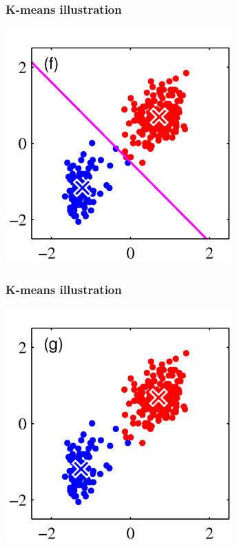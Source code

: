 \documentclass[12pt,notes,mathserif]{beamer}
\begin{document}
\begin{frame}[c]
	\frametitle{K-means illustration}
	\begin{center}
		\includegraphics[width=0.65\textwidth]{fig/lec723.jpg}
	\end{center}
\end{frame}

\begin{frame}[c]
	\frametitle{K-means illustration}
	\begin{center}
		\includegraphics[width=0.65\textwidth]{fig/lec724.jpg}
	\end{center}
\end{frame}
\end{document}
